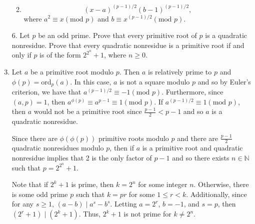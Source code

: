 \documentclass[12pt]{article}
\makeatletter
\theoremstyle{definition}
\theoremstyle{remark}
\renewenvironment{proof}[1][\proofname]{\par
  \pushQED{\qed}%
  \normalfont \topsep6\p@\@plus6\p@\relax
  \list{}{\leftmargin=0mm
          \rightmargin=4mm
          \settowidth{\itemindent}{\itshape#1}%
          \labelwidth=\itemindent
          \parsep=0pt \listparindent=\parindent 
  }
  \item[\hskip\labelsep
        \itshape
    #1\@addpunct{.}]\ignorespaces
}{%
  \popQED\endlist\@endpefalse
}
\newenvironment{solution}[1][\bf{\textit{Solution}}]{\par
  
  \normalfont \topsep6\p@\@plus6\p@\relax
  \list{}{\leftmargin=0mm
          \rightmargin=4mm
          \settowidth{\itemindent}{\itshape#1}%
          \labelwidth=\itemindent
          \parsep=0pt \listparindent=\parindent 
  }
  \item[\hskip\labelsep
        \itshape
    #1\@addpunct{.}]\ignorespaces
}{%
  \popQED\endlist\@endpefalse
}
\let\oldproofname=\proofname
\renewcommand{\proofname}{\bf{\textit{\oldproofname}}}
\makeatother
\begin{document}
\begin{enumerate}[leftmargin=*]
\begin{enumerate}
\begin{solution}
                            \begin{equation*}
                                (x-a)^{(p-1)/2}(b-1)^{(p-1)/2},
                            \end{equation*}
                        where $a^2\equiv x(\text{mod }p)$ and $b\equiv x^{(p-1)/2}(\text{mod }p)$.
                    \end{solution}
            \end{enumerate}
        \item[6.] Let $p$ be an odd prime. Prove that every primitive root of $p$ is a quadratic nonresidue. Prove that every quadratic nonresidue is a primitive root if and only if $p$ is of the form $2^{2^n}+1$, where $n\geq 0$.
            \begin{proof}
                Let $a$ be a primitive root modulo $p$. Then $a$ is relatively prime to $p$ and $\phi(p)=\text{ord}_p(a)$. In this case, $a$ is not a square modulo $p$ and so by Euler's criterion, we have that $a^{(p-1)/2}\equiv -1(\text{mod }p)$. Furthermore, since $(a,p)=1$, then $a^{\phi(p)}\equiv a^{p-1}\equiv 1(\text{mod }p)$. If $a^{(p-1)/2}\equiv 1(\text{mod }p)$, then $a$ would not be a primitive root since $\frac{p-1}{2}<p-1$ and so $a$ is a quadratic nonresidue.\par\hspace{4mm} Since there are $\phi(\phi(p))$ primitive roots modulo $p$ and there are $\frac{p-1}{2}$ quadratic nonresidues modulo $p$, then if $a$ is a primitive root and quadratic nonresidue implies that 2 is the only factor of $p-1$ and so there exists $n\in\mathbb{N}$ such that $p=2^{2^n}+1$.\par\hspace{4mm} Note that if $2^k+1$ is prime, then $k=2^n$ for some integer $n$. Otherwise, there is some odd prime $p$ such that $k=pr$ for some $1\leq r< k$. Additionally, since for any $s\geq 1$, $(a-b)\mid a^s-b^s$. Letting $a=2^r$, $b=-1$, and $s=p$, then $(2^r+1)\mid(2^k+1)$. Thus, $2^k+1$ is not prime for $k\neq 2^n$.  
            \end{proof}
    \end{enumerate}
\end{document}
